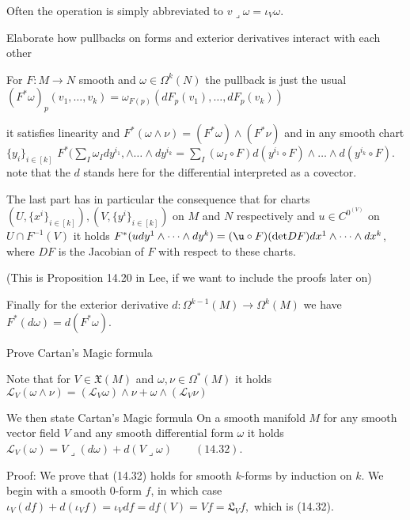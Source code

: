 Often the operation is simply abbreviated to
\( v \lrcorner \omega = \iota_V \omega \).


Elaborate how pullbacks on forms and exterior derivatives interact with each other

For \( F : M \to N \) smooth and \( \omega \in \Omega^k(N) \) the pullback 
is just the usual
\( (F^\ast \omega)_p(v_1, \dots, v_k) = \omega_{F(p)}(dF_p(v_1), \dots, dF_p(v_k)) \)

it satisfies linearity and
\( F^\ast(\omega \wedge \nu) = (F^\ast \omega) \wedge (F^\ast \nu) \)
and in any smooth chart \( \{y_i\}_{i \in [k]} \)
\( F^\ast(\sum_{I} \omega_I dy^{i_1}, \wedge \dots \wedge dy^{i_k} = \sum_{I} (\omega_I \circ F) d(y^{i_1} \circ F) \wedge \dots \wedge d(y^{i_k} \circ F) \).
note that the \( d \) stands here for the differential interpreted as a covector.

The last part has in particular the consequence that for charts \( (U, \{x^i\}_{i \in [k]}), (V, \{y^i\}_{i \in [k]}) \)
on \( M \) and \( N \) respectively and \( u \in C^{0}^(V) \) on \( U \cap F^{-1}(V) \) it holds
\( F^\ast (u dy^1 \wedge \dots \wedge dy^k) = (\u \circ F)(\text{det} DF)dx^1 \wedge \dots \wedge dx^k \),
where \( DF \) is the Jacobian of \( F \) with respect to these charts.

(This is Proposition 14.20 in Lee, if we want to include the proofs later on)

Finally for the exterior derivative \( d : \Omega^{k-1}(M) \to \Omega^{k}(M)\) we have
\( F^\ast(d\omega) = d(F^\ast\omega) \).


Prove Cartan's Magic formula

Note that for \( V \in \mathfrak{X}(M) \) and \( \omega, \nu \in \Omega^\ast(M) \)
it holds
\( \mathcal{L}_{V}(\omega \wedge \nu) = (\mathcal{L}_{V} \omega) \wedge \nu + \omega \wedge (\mathcal{L}_{V}\nu) \)

We then state Cartan's Magic formula
On a smooth manifold \( M \) for any smooth vector field \( V \) and any smooth differential form \( \omega \)
it holds
\( \mathcal{L}_{V}(\omega) = V \lrcorner(d\omega) + d(V \lrcorner \omega) \qquad (14.32) \).

Proof:
We prove that (14.32) holds for smooth \(k\)-forms by induction on \(k\). 
We begin with a smooth 0-form \(f\), in which case
\(\iota_V (df) + d(\iota_V f) = \iota_V df = df(V) = Vf = \mathfrak{L}_V f,\)
which is (14.32).

